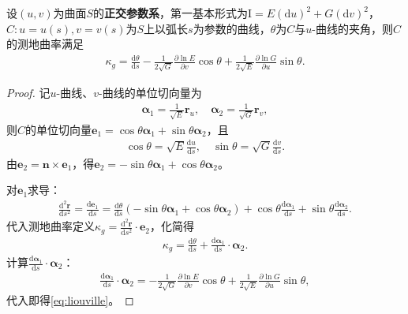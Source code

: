 \documentclass[../../main.tex]{subfiles}%
\begin{document}
\begin{theorem}
设$(u,v)$为曲面$S$的\textbf{正交参数系}，第一基本形式为$\mathrm{I}=E(\mathrm{d}u)^2+G(\mathrm{d}v)^2$，$C:u=u(s),v=v(s)$为$S$上以弧长$s$为参数的曲线，$\theta$为$C$与$u$-曲线的夹角，则$C$的测地曲率满足
\begin{align}
\kappa_g=\frac{\mathrm{d}\theta}{\mathrm{d}s}-\frac{1}{2\sqrt{G}}\frac{\partial\ln E}{\partial v}\cos\theta+\frac{1}{2\sqrt{E}}\frac{\partial\ln G}{\partial u}\sin\theta.\label{eq:liouville}
\end{align}
\end{theorem}
\begin{proof}
记$u$-曲线、$v$-曲线的单位切向量为
\begin{align*}
\boldsymbol{\alpha}_1=\frac{1}{\sqrt{E}}\boldsymbol{r}_u,\quad \boldsymbol{\alpha}_2=\frac{1}{\sqrt{G}}\boldsymbol{r}_v,
\end{align*}
则$C$的单位切向量$\boldsymbol{e}_1=\cos\theta\boldsymbol{\alpha}_1+\sin\theta\boldsymbol{\alpha}_2$，且
\begin{align*}
\cos\theta=\sqrt{E}\frac{\mathrm{d}u}{\mathrm{d}s},\quad \sin\theta=\sqrt{G}\frac{\mathrm{d}v}{\mathrm{d}s}.
\end{align*}
由$\boldsymbol{e}_2=\boldsymbol{n}\times\boldsymbol{e}_1$，得$\boldsymbol{e}_2=-\sin\theta\boldsymbol{\alpha}_1+\cos\theta\boldsymbol{\alpha}_2$。

对$\boldsymbol{e}_1$求导：
\begin{align*}
\frac{\mathrm{d}^2\boldsymbol{r}}{\mathrm{d}s^2}=\frac{\mathrm{d}\boldsymbol{e}_1}{\mathrm{d}s}=\frac{\mathrm{d}\theta}{\mathrm{d}s}(-\sin\theta\boldsymbol{\alpha}_1+\cos\theta\boldsymbol{\alpha}_2)+\cos\theta\frac{\mathrm{d}\boldsymbol{\alpha}_1}{\mathrm{d}s}+\sin\theta\frac{\mathrm{d}\boldsymbol{\alpha}_2}{\mathrm{d}s}.
\end{align*}
代入测地曲率定义$\kappa_g=\frac{\mathrm{d}^2\boldsymbol{r}}{\mathrm{d}s^2}\cdot\boldsymbol{e}_2$，化简得
\begin{align*}
\kappa_g=\frac{\mathrm{d}\theta}{\mathrm{d}s}+\frac{\mathrm{d}\boldsymbol{\alpha}_1}{\mathrm{d}s}\cdot\boldsymbol{\alpha}_2.
\end{align*}
计算$\frac{\mathrm{d}\boldsymbol{\alpha}_1}{\mathrm{d}s}\cdot\boldsymbol{\alpha}_2$：
\begin{align*}
\frac{\mathrm{d}\boldsymbol{\alpha}_1}{\mathrm{d}s}\cdot\boldsymbol{\alpha}_2=-\frac{1}{2\sqrt{G}}\frac{\partial\ln E}{\partial v}\cos\theta+\frac{1}{2\sqrt{E}}\frac{\partial\ln G}{\partial u}\sin\theta,
\end{align*}
代入即得\eqref{eq:liouville}。
\end{proof}
\end{document}

